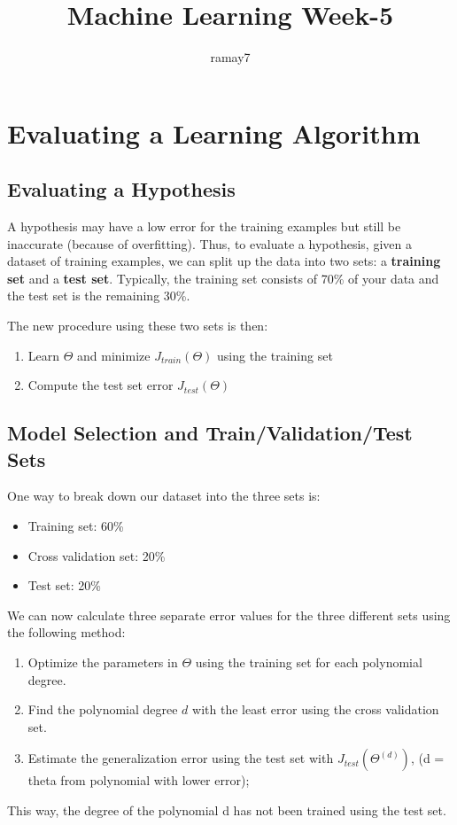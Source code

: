 \documentclass[11pt]{article}
\begin{document}
	\title{Machine Learning Week-5}
	\author{ramay7}
	
	\maketitle %
	\tableofcontents %
	
	\section{Evaluating a Learning Algorithm}
	
		\subsection{Evaluating a Hypothesis}
		
		A hypothesis may have a low error for the training examples but still be inaccurate (because of overfitting). Thus, to evaluate a hypothesis, given a dataset of training examples, we can split up the data into two sets: a \textbf{training set} and a \textbf{test set}. Typically, the training set consists of 70\% of your data and the test set is the remaining 30\%.
		
		The new procedure using these two sets is then:
		\begin{enumerate}
			\item Learn $\Theta$ and minimize $J_{train}(\Theta)$ using the training set
			\item Compute the test set error $J_{test}(\Theta)$
		\end{enumerate}
		
		\subsection{Model Selection and Train/Validation/Test Sets}
		One way to break down our dataset into the three sets is:
		\begin{itemize}
			\item Training set: 60\%
			\item Cross validation set: 20\%
			\item Test set: 20\%
		\end{itemize}
		
		We can now calculate three separate error values for the three different sets using the following method:
		\begin{enumerate}
			\item Optimize the parameters in $\Theta$ using the training set for each polynomial degree.
			\item Find the polynomial degree $d$ with the least error using the cross validation set.
			\item Estimate the generalization error using the test set with $J_{test}(\Theta^{(d)})$, (d = theta from polynomial with lower error);
		\end{enumerate}
		This way, the degree of the polynomial d has not been trained using the test set.
	
\end{document}
